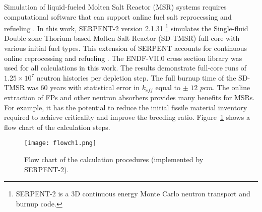 Simulation of liquid-fueled Molten Salt Reactor (MSR) systems requires 
computational software that can support online fuel salt reprocessing and 
refueling \cite{serp2014molten}. In this work, SERPENT-2 version 2.1.31 
\footnote{SERPENT-2 is a 3D continuous energy Monte Carlo neutron 
transport and burnup code.} \cite{leppanen2014serpent} simulates the 
Single-fluid Double-zone Thorium-based Molten Salt Reactor (SD-TMSR) full-core with various initial fuel types. This extension 
of SERPENT accounts for continuous online reprocessing and refueling 
\cite{aufiero2013extended}. The ENDF-VII.0 cross section library was used for all 
calculations in this work. The results demonstrate full-core runs of 
$1.25\times 10^7$ neutron histories per depletion step. The full burnup time of 
the SD-TMSR was 60 years with statistical error in $k_{eff}$ equal to $\pm$ 
$12$ $pcm$. The online extraction of \gls{FPs} and other neutron absorbers 
provides many benefits for MSRs. For example, it has the potential to reduce the initial 
fissile material inventory required to achieve criticality and improve the 
breeding ratio. Figure~\ref{fig:flow} shows a flow chart of the calculation 
steps. 

\begin{figure}[t!] %
	\texttt{[image: flowch1.png]}
	\caption{Flow chart of the calculation procedures (implemented by SERPENT-2).}
	\label{fig:flow}
\end{figure}

